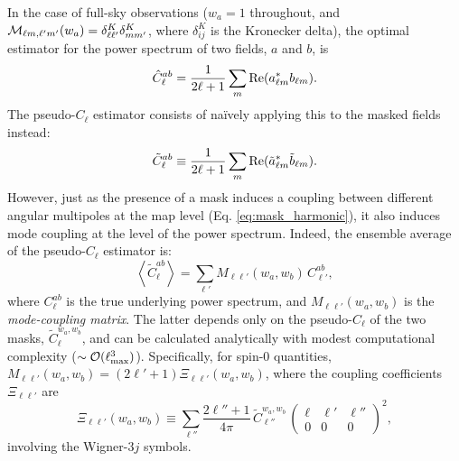 \documentclass[%
 reprint,
superscriptaddress,
nofootinbib,
 amsmath,amssymb,
 aps,
 prd,
]{revtex4-2}
\newcommand{\wtj}[6]{\left(\begin{array}{ccc} #1 & #2 & #3\\#4 & #5 & #6\end{array} \right)}
\begin{document}
    In the case of full-sky observations ($w_a=1$ throughout, and ${\cal M}_{\ell m,\ell'm'}(w_a)=\delta^K_{\ell\ell'}\delta^K_{mm'}$, where $\delta^K_{ij}$ is the Kronecker delta), the optimal estimator for the power spectrum of two fields, $a$ and $b$, is
    \begin{equation}
      \hat{C}^{ab}_\ell=\frac{1}{2\ell+1}\sum_m{\rm Re}(a^*_{\ell m}b_{\ell m}).
    \end{equation}
    The pseudo-$C_\ell$ estimator consists of na\"ively applying this to the masked fields instead:
    \begin{equation}\label{eq:pcl_def}
      \tilde{C}^{ab}_\ell\equiv\frac{1}{2\ell+1}\sum_m{\rm Re}(\tilde{a}^*_{\ell m}\tilde{b}_{\ell m}).
    \end{equation}
    However, just as the presence of a mask induces a coupling between different angular multipoles at the map level (Eq. \ref{eq:mask_harmonic}), it also induces mode coupling at the level of the power spectrum. Indeed, the ensemble average of the pseudo-$C_\ell$ estimator is:
    \begin{equation}\label{eq:pcl}
      \left\langle \tilde{C}^{ab}_\ell\right\rangle=\sum_{\ell'} M_{\ell\ell'}(w_a,w_b)\,C^{ab}_{\ell'},
    \end{equation}
    where $C^{ab}_\ell$ is the true underlying power spectrum, and $M_{\ell\ell'}(w_a,w_b)$ is the \emph{mode-coupling matrix}. The latter depends only on the pseudo-$C_\ell$ of the two masks, $\tilde{C}^{w_a,w_b}_\ell$, and can be calculated analytically with modest computational complexity \citep{astro-ph/0105302} ($\sim{\cal O}(\ell_{\rm max}^3)$). Specifically, for spin-0 quantities, $M_{\ell\ell'}(w_a,w_b)=(2\ell'+1)\Xi_{\ell\ell'}(w_a,w_b)$, where the coupling coefficients $\Xi_{\ell\ell'}$ are
    \begin{equation}\label{eq:Xi}
      \Xi_{\ell\ell'}(w_a,w_b)\equiv\sum_{\ell''}\frac{2\ell''+1}{4\pi}\,\tilde{C}^{w_a,w_b}_{\ell''}\,\wtj{\ell}{\ell'}{\ell''}{0}{0}{0}^2,
    \end{equation}
    involving the Wigner-$3j$ symbols.
\end{document}
